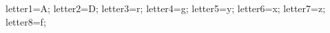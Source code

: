 \documentclass[exercice]{thedocument}%
\begin{document}
%
\>letter1=A;%
\>letter2=D;%
\>letter3=r;%
\>letter4=g;%
\>letter5=y;%
\>letter6=x;%
\>letter7=z;%
\>letter8=f;%
%
\end{document}
